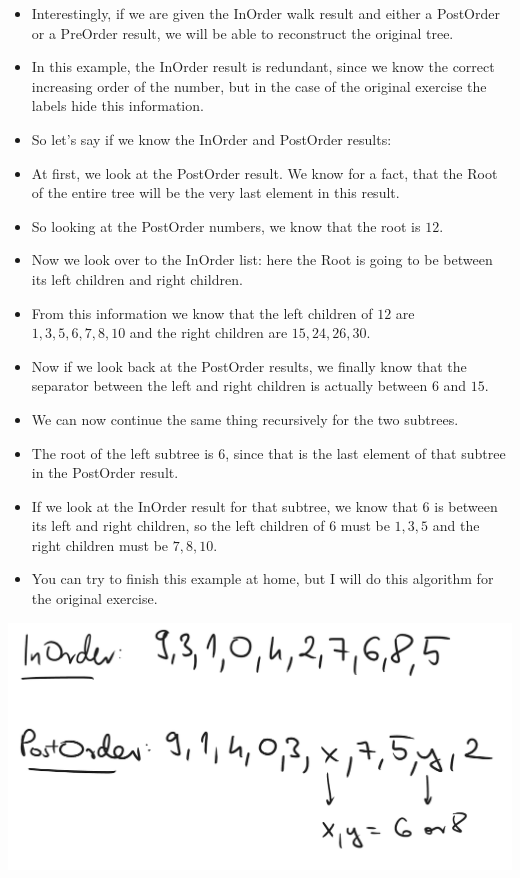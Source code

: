 \begin{itemize}
    \item Interestingly, if we are given the InOrder walk result and either a PostOrder or a PreOrder result, we will be able to reconstruct the original tree.
    \item In this example, the InOrder result is redundant, since we know the correct increasing order of the number, but in the case of the original exercise the labels hide this information.
    \item So let's say if we know the InOrder and PostOrder results:
    \item At first, we look at the PostOrder result. We know for a fact, that the Root of the entire tree will be the very last element in this result.
    \item So looking at the PostOrder numbers, we know that the root is $12$.
    \item Now we look over to the InOrder list: here the Root is going to be between its left children and right children.
    \item From this information we know that the left children of $12$ are $1,3,5,6,7,8,10$ and the right children are $15,24,26,30$.
    \item Now if we look back at the PostOrder results, we finally know that the separator between the left and right children is actually between $6$ and $15$.
    \item We can now continue the same thing recursively for the two subtrees.
    \item The root of the left subtree is $6$, since that is the last element of that subtree in the PostOrder result.
    \item If we look at the InOrder result for that subtree, we know that $6$ is between its left and right children, so the left children of $6$ must be $1,3,5$ and the right children must be $7,8,10$.
    \item You can try to finish this example at home, but I will do this algorithm for the original exercise.
\end{itemize}


\begin{center}
    \includegraphics[width=\linewidth]{11/11/reconstruct_01.png}
\end{center}

